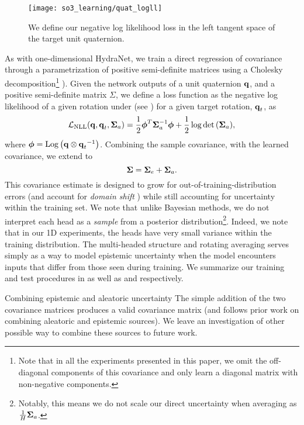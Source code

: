 \begin{wrapfigure}{r}{0.35\textwidth}
  \vspace{-20pt}
  \begin{center}
	\texttt{[image: so3\_learning/quat\_logll]}
  \end{center}
    \vspace{-20pt}
	\label{fig:math_quat_uncertainty}
	\caption{We define our negative log likelihood loss in the left tangent space of the target unit quaternion.}
\end{wrapfigure} 

As with one-dimensional HydraNet, we train a direct regression of covariance through a parametrization of positive semi-definite matrices using a Cholesky decomposition\footnote{Note that in all the experiments presented in this paper, we omit the off-diagonal components of this covariance and only learn a diagonal matrix with non-negative components.} \citep{Hu2015-uw,Haarnoja2016-ph}). Given the network outputs of a unit quaternion $\boldsymbol{\mathbf{q}}$, and a positive semi-definite matrix $\Sigma$, we define a loss function as the negative log likelihood of a given rotation under  (see \citep{Forster2015-af}) for a given target rotation, $\boldsymbol{\mathbf{q}}_t$, as
\begin{equation}
\label{eq:nll_loss}
\mathcal{L}_\mathrm{NLL}(\boldsymbol{\mathbf{q}}, \boldsymbol{\mathbf{q}}_t, \boldsymbol{\mathbf{\Sigma}}_a) = \frac{1}{2}\boldsymbol{\mathbf{\phi}}^T \boldsymbol{\mathbf{\Sigma}}_a^{-1}\boldsymbol{\mathbf{\phi}} + \frac{1}{2} \log{ \mathrm{det}\left( \boldsymbol{\mathbf{\Sigma}} _a\right) },
\end{equation}
\noindent where  $\boldsymbol{\mathbf{\phi}} = \mathrm{Log}\left({\boldsymbol{\mathbf{q}} \otimes { \boldsymbol{\mathbf{q}} _t}^{-1}}\right)$. Combining the sample covariance, with the learned covariance, we extend  to
\begin{equation}
\boldsymbol{\mathbf{\Sigma}} = \boldsymbol{\mathbf{\Sigma}}_e + \boldsymbol{\mathbf{\Sigma}}_a.
\end{equation}
This covariance estimate is designed to grow for out-of-training-distribution errors (and account for \textit{domain shift} \citep{Lakshminarayanan2017}) while still accounting for uncertainty within the training set. We note that unlike Bayesian methods, we do not interpret each head as a \textit{sample} from a posterior distribution\footnote{Notably, this means we do not scale our direct uncertainty when averaging as $\frac{1}{H}\boldsymbol{\mathbf{\Sigma}}_a$.}. Indeed, we note that in our 1D experiments, the heads have very small variance within the training distribution. The multi-headed structure and rotating averaging serves simply as a way to model epistemic uncertainty when the model encounters inputs that differ from those seen during training. We summarize our training and test procedures in  as well as  and  respectively. 
\begin{remark}{Combining epistemic and aleatoric uncertainty}
	The simple addition of the two covariance matrices produces a valid covariance matrix (and follows prior work \cite{Kendall2017-vs} on combining aleatoric and epistemic sources). We leave an investigation of other possible way to combine these sources to future work.
\end{remark}

